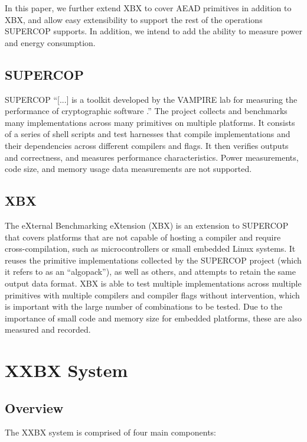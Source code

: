 \documentclass[twoside,11pt]{cergdoc}
\begin{document}
In this paper, we further extend XBX to cover AEAD primitives in addition to
XBX, and allow easy extensibility to support the rest of the operations SUPERCOP
supports. In addition, we intend to add the ability to measure power and energy
consumption.

  \section{SUPERCOP}
SUPERCOP ``[...] is a toolkit developed by the VAMPIRE lab for measuring
the performance of cryptographic software \cite{supercop}.'' The project collects
and benchmarks many implementations across many primitives on multiple
platforms. It consists of a series of shell scripts and test harnesses that
compile implementations and their dependencies across different compilers and
flags. It then verifies outputs and correctness, and measures performance
characteristics. Power measurements, code size, and memory usage data
measurements are not supported.

  \section{XBX}
The eXternal Benchmarking eXtension (XBX)\cite{xbx} is an extension to SUPERCOP that covers
platforms that are not capable of hosting a compiler and require cross-compilation,
such as microcontrollers or small embedded Linux systems. It reuses the
primitive implementations collected by the SUPERCOP project (which it refers to as
an ``algopack''), as well as others, and
attempts to retain the same output data format. XBX is able to test multiple
implementations across multiple primitives  with multiple compilers and compiler
flags without intervention, which is important with the large number of
combinations to be tested. Due to the importance of small code and memory size for
embedded platforms, these are also measured and recorded.

\chapter{XXBX System}
  \section{Overview}
The XXBX system is comprised of four main
components:
\end{document}
